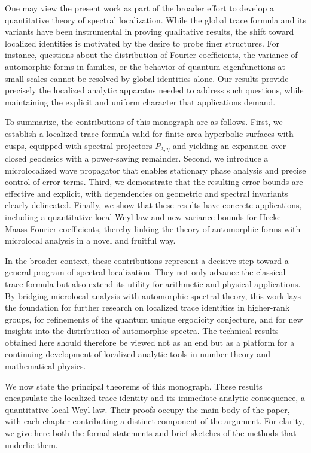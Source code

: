 One may view the present work as part of the broader effort to develop a
quantitative theory of spectral localization. While the global trace formula
and its variants have been instrumental in proving qualitative results, the
shift toward localized identities is motivated by the desire to probe finer
structures. For instance, questions about the distribution of Fourier
coefficients, the variance of automorphic forms in families, or the behavior of
quantum eigenfunctions at small scales cannot be resolved by global identities
alone. Our results provide precisely the localized analytic apparatus needed to
address such questions, while maintaining the explicit and uniform character
that applications demand.

To summarize, the contributions of this monograph are as follows. First, we
establish a localized trace formula valid for finite-area hyperbolic surfaces
with cusps, equipped with spectral projectors $P_{\lambda,\eta}$ and yielding
an expansion over closed geodesics with a power-saving remainder. Second, we
introduce a microlocalized wave propagator that enables stationary phase
analysis and precise control of error terms. Third, we demonstrate that the
resulting error bounds are effective and explicit, with dependencies on
geometric and spectral invariants clearly delineated. Finally, we show that
these results have concrete applications, including a quantitative local Weyl
law and new variance bounds for Hecke–Maass Fourier coefficients, thereby
linking the theory of automorphic forms with microlocal analysis in a novel and
fruitful way.

In the broader context, these contributions represent a decisive step toward a
general program of spectral localization. They not only advance the classical
trace formula but also extend its utility for arithmetic and physical
applications. By bridging microlocal analysis with automorphic spectral theory,
this work lays the foundation for further research on localized trace identities
in higher-rank groups, for refinements of the quantum unique ergodicity
conjecture, and for new insights into the distribution of automorphic spectra.
The technical results obtained here should therefore be viewed not as an end
but as a platform for a continuing development of localized analytic tools in
number theory and mathematical physics.

We now state the principal theorems of this monograph. These results encapsulate
the localized trace identity and its immediate analytic consequence, a
quantitative local Weyl law. Their proofs occupy the main body of the paper,
with each chapter contributing a distinct component of the argument. For clarity,
we give here both the formal statements and brief sketches of the methods that
underlie them.

